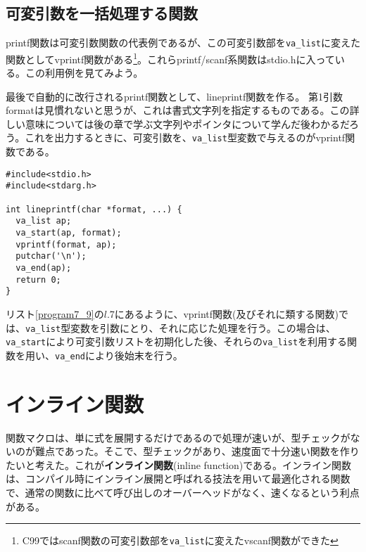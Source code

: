 \subsection{可変引数を一括処理する関数}
printf関数は可変引数関数の代表例であるが、この可変引数部を\verb|va_list|に変えた関数としてvprintf関数がある\footnote{C99ではscanf関数の可変引数部を\verb|va_list|に変えたvscanf関数ができた}。これらprintf/scanf系関数はstdio.hに入っている。この利用例を見てみよう。
\begin{boxnote}
\begin{multicols}{2}
最後で自動的に改行されるprintf関数として、lineprintf関数を作る。
第1引数formatは見慣れないと思うが、これは書式文字列を指定するものである。この詳しい意味については後の章で学ぶ文字列やポインタについて学んだ後わかるだろう。これを出力するときに、可変引数を、\verb|va_list|型変数で与えるのがvprintf関数である。
\begin{lstlisting}[caption=改行付きprintf,label=program7_9]
#include<stdio.h> 
#include<stdarg.h> 

int lineprintf(char *format, ...) {
  va_list ap; 
  va_start(ap, format); 
  vprintf(format, ap); 
  putchar('\n'); 
  va_end(ap); 
  return 0; 
}
\end{lstlisting}
\end{multicols}
\end{boxnote}

リスト\ref{program7_9}の$l$.7にあるように、vprintf関数(及びそれに類する関数)では、\verb|va_list|型変数を引数にとり、それに応じた処理を行う。この場合は、\verb|va_start|により可変引数リストを初期化した後、それらの\verb|va_list|を利用する関数を用い、\verb|va_end|により後始末を行う。

\section{インライン関数}
関数マクロは、単に式を展開するだけであるので処理が速いが、型チェックがないのが難点であった。そこで、型チェックがあり、速度面で十分速い関数を作りたいと考えた。これが\textbf{インライン関数}(inline function)である。インライン関数は、コンパイル時にインライン展開と呼ばれる技法を用いて最適化される関数で、通常の関数に比べて呼び出しのオーバーヘッドがなく、速くなるという利点がある。

